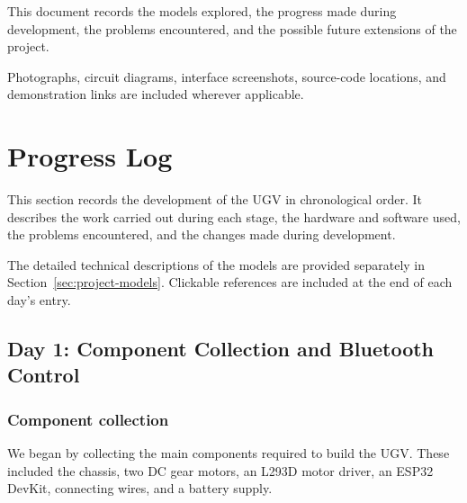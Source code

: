\documentclass[11pt,a4paper]{article}
\begin{document}
This document records the models explored, the progress
made during development, the problems encountered, and
the possible future extensions of the project.

Photographs, circuit diagrams, interface screenshots,
source-code locations, and demonstration links are
included wherever applicable.



\newpage

\setcounter{tocdepth}{3}
\tableofcontents

\newpage

\listoffigures

\newpage



\section{Progress Log}

This section records the development of the UGV in
chronological order. It describes the work carried out
during each stage, the hardware and software used,
the problems encountered, and the changes made during
development.

The detailed technical descriptions of the models are
provided separately in Section~\ref{sec:project-models}.
Clickable references are included at the end of each
day's entry.



\subsection{Day 1: Component Collection and Bluetooth Control}

\subsubsection{Component collection}

We began by collecting the main components required
to build the UGV. These included the chassis, two DC
gear motors, an L293D motor driver, an ESP32 DevKit,
connecting wires, and a battery supply.
\end{document}
